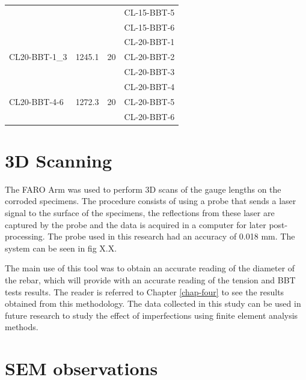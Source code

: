 \begin{table}[htbp]
\begin{tabular}{lccl}
                               &                         &                     & CL-15-BBT-5           \\
                               &                         &                     & CL-15-BBT-6           \\
\multirow{3}{*}{CL20-BBT-1\_3} & \multirow{3}{*}{1245.1} & \multirow{3}{*}{20} & CL-20-BBT-1           \\
                               &                         &                     & CL-20-BBT-2           \\
                               &                         &                     & CL-20-BBT-3           \\
\multirow{3}{*}{CL20-BBT-4-6}  & \multirow{3}{*}{1272.3} & \multirow{3}{*}{20} & CL-20-BBT-4           \\
                               &                         &                     & CL-20-BBT-5           \\
                               &                         &                     & CL-20-BBT-6          
\end{tabular}
\end{table}



\newpage

\section{3D Scanning}

The FARO Arm \cite{FAROTechnologiesInc.2022} was used to perform 3D scans of the gauge lengths on the corroded specimens. The procedure consists of using a probe that sends a laser signal to the surface of the specimens, the reflections from these laser are captured by the probe and the data is acquired in a computer for later post-processing. The probe used in this research had an accuracy of 0.018 mm. The system can be seen in fig X.X.


The main use of this tool was to obtain an accurate reading of the diameter of the rebar, which will provide with an accurate reading of the tension and BBT tests results. The reader is referred to Chapter \ref{chap-four} to see the results obtained from this methodology. The data collected in this study can be used in future research to study the effect of imperfections using finite element analysis methods.

\section{SEM observations}

